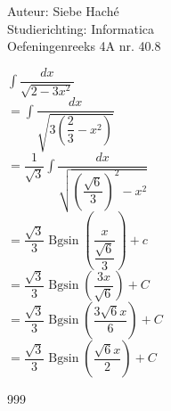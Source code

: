 \documentclass[a4paper]{article}
\newcommand{\Bgsin}{\operatorname{Bgsin}}
\begin{document}
\noindent \large Auteur: Siebe Haché \\
\noindent \large Studierichting: Informatica\\
\noindent \large Oefeningenreeks 4A nr. 40.8\\

\medskip
\normalsize

$\displaystyle\int \dfrac{dx}{\sqrt{2 - 3x^2}}$\\

$= \displaystyle\int \dfrac{dx}{\sqrt{3\left(\dfrac{2}{3} - x^2\right)}}$\\

$= \dfrac{1}{\sqrt{3}} \displaystyle\int \dfrac{dx}{\sqrt{\left(\dfrac{\sqrt{6}}{3}\right)^2 - x^2}}$\\

$= \dfrac{\sqrt{3}}{3} \Bgsin \left( \dfrac{x}{\dfrac{\sqrt{6}}{3}} \right) + c$\\

$= \dfrac{\sqrt{3}}{3} \Bgsin \left( \dfrac{3x}{\sqrt{6}} \right) + C$\\

$= \dfrac{\sqrt{3}}{3} \Bgsin \left( \dfrac{3\sqrt{6} x}{6} \right) + C$\\

$= \dfrac{\sqrt{3}}{3} \Bgsin \left( \dfrac{\sqrt{6} x}{2} \right) + C$\\

\begin{thebibliography}{999}
\end{thebibliography}
\end{document}
